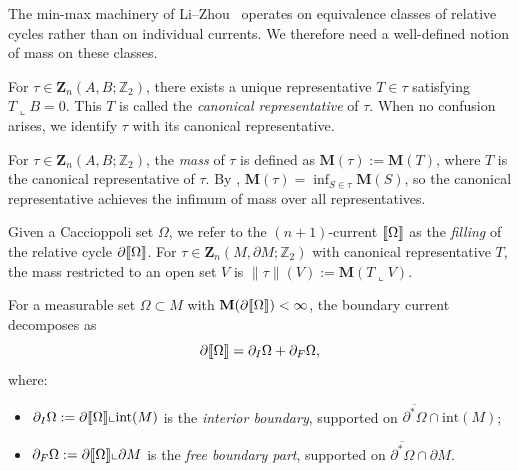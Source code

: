 The min-max machinery of Li--Zhou~\cite{LZ17} operates on equivalence classes of relative cycles rather than on individual currents. We therefore need a well-defined notion of mass on these classes.

\begin{definition}\label{def:canonical-rep}
For $\tau \in \mathbf{Z}_n(A, B;\mathbb{Z}_2)$, there exists a unique representative $T \in \tau$ satisfying $T \llcorner B = 0$. This $T$ is called the \emph{canonical representative} of $\tau$. When no confusion arises, we identify $\tau$ with its canonical representative.
\end{definition}

\begin{definition}\label{def:mass-equivalence-class}
For $\tau \in \mathbf{Z}_n(A, B;\mathbb{Z}_2)$, the \emph{mass} of $\tau$ is defined as $\mathbf{M}(\tau) := \mathbf{M}(T)$, where $T$ is the canonical representative of $\tau$. By \cite[Lemma~3.3]{LZ17}, $\mathbf{M}(\tau) = \inf_{S \in \tau} \mathbf{M}(S)$, so the canonical representative achieves the infimum of mass over all representatives.
\end{definition}

Given a Caccioppoli set $\Omega$, we refer to the $(n{+}1)$-current $\llbracket \Omega \rrbracket$ as the \emph{filling} of the relative cycle $\partial\llbracket \Omega \rrbracket$. For $\tau \in \mathbf{Z}_n(M, \partial M;\mathbb{Z}_2)$ with canonical representative $T$, the mass restricted to an open set $V$ is $\|\tau\|(V) := \mathbf{M}(T \llcorner V)$.

\begin{definition}\label{def:boundary-decomposition}
For a measurable set $\Omega \subset M$ with $\mathbf{M}{(\partial\llbracket \Omega \rrbracket)} < \infty$, the boundary current decomposes as
\[
\partial \llbracket \Omega \rrbracket = \partial_I \Omega + \partial_F \Omega,
\]
where:
\begin{itemize}
    \item $\partial_I \Omega := \partial \llbracket \Omega \rrbracket \llcorner \mathrm{int}(M)$ is the \emph{interior boundary}, supported on $\overline{\partial^*\Omega} \cap \mathrm{int}(M)$;
    \item $\partial_F \Omega := \partial \llbracket \Omega \rrbracket \llcorner \partial M$ is the \emph{free boundary part}, supported on $\overline{\partial^*\Omega} \cap \partial M$.
\end{itemize}
\end{definition}

